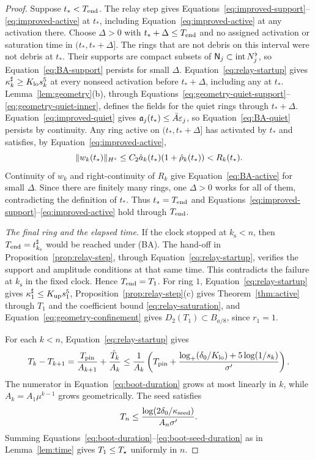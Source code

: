 \begin{proof}
Suppose $t_*<T_{\mathrm{end}}$. The relay step gives
Equations~\eqref{eq:improved-support}--\eqref{eq:improved-active} at $t_*$,
including Equation~\eqref{eq:improved-active} at any activation there.
Choose $\Delta>0$ with
$t_*+\Delta\le T_{\mathrm{end}}$ and no assigned activation or saturation time in
$(t_*,t_*+\Delta]$. The rings that are not debris on this interval were not
debris at $t_*$. Their supports are compact subsets of
$\mathsf{N}_j\subset\operatorname{int}N^{\flat}_j$, so Equation~\eqref{eq:BA-support}
persists for small $\Delta$. Equation~\eqref{eq:relay-startup} gives
$\kappa^\sharp_k\ge K_{\mathrm{lo}} s_k^5$ at every nonseed activation before $t_*+\Delta$,
including any at $t_*$. Lemma~\ref{lem:geometry}(b), through
Equations~\eqref{eq:geometry-quiet-support}--\eqref{eq:geometry-quiet-inner},
defines the fields for the quiet rings through $t_*+\Delta$.
Equation~\eqref{eq:improved-quiet} gives
$\mathfrak{a}_j(t_*)\le\bar A\varepsilon_j$, so Equation~\eqref{eq:BA-quiet}
persists by continuity. Any ring active on $(t_*,t_*+\Delta]$ has activated
by $t_*$ and satisfies, by Equation~\eqref{eq:improved-active},
\begin{equation}
\label{eq:boot-continuation-margin}
\|w_k(t_*)\|_{H^s}\le C_2\hat a_k(t_*)(1+\hat\rho_k(t_*))<R_k(t_*).
\end{equation}
Continuity of $w_k$ and right-continuity of $R_k$ give
Equation~\eqref{eq:BA-active} for small $\Delta$.
Since there are finitely many rings, one $\Delta>0$ works for all
of them, contradicting the definition of $t_*$. Thus $t_*=T_{\mathrm{end}}$ and
Equations~\eqref{eq:improved-support}--\eqref{eq:improved-active} hold through
$T_{\mathrm{end}}$.

\emph{The final ring and the elapsed time.}
If the clock stopped at $k_{\mathrm s}<n$, then
$T_{\mathrm{end}}=t^\sharp_{k_{\mathrm s}}$ would be reached under (BA). The hand-off in
Proposition~\ref{prop:relay-step}, through Equation~\eqref{eq:relay-startup},
verifies the support and amplitude conditions at that same time. This
contradicts the failure at
$k_{\mathrm s}$ in the fixed clock. Hence $T_{\mathrm{end}}=T_1$.
For ring $1$, Equation~\eqref{eq:relay-startup} gives $\kappa^\sharp_1\le K_{\mathrm{up}} s_1^5$,
Proposition~\ref{prop:relay-step}(c) gives Theorem~\ref{thm:active} through
$T_1$ and the coefficient bound \eqref{eq:relay-saturation}, and
Equation~\eqref{eq:geometry-confinement} gives $D_2(T_1)\subset B_{a/8}$,
since $r_1=1$.

For each $k<n$, Equation~\eqref{eq:relay-startup} gives
\begin{equation}
\label{eq:boot-duration}
T_k-T_{k+1}
=\frac{T_{\mathrm{pin}}}{A_{k+1}}+\frac{\hat T_k}{A_k}
\le\frac{1}{A_k}\left(T_{\mathrm{pin}}+
\frac{\log_+(\delta_0/K_{\mathrm{lo}})+5\log(1/s_k)}{\sigma'}\right).
\end{equation}
The numerator in Equation~\eqref{eq:boot-duration} grows at most linearly
in $k$, while $A_k=A_1\mu^{k-1}$ grows geometrically. The seed satisfies
\begin{equation}
\label{eq:boot-seed-duration}
T_n\le\frac{\log(2\delta_0/\kappa_{\mathrm{seed}})}{A_n\sigma'}.
\end{equation}
Summing Equations~\eqref{eq:boot-duration}--\eqref{eq:boot-seed-duration}
as in Lemma~\ref{lem:time} gives $T_1\le T_\star$ uniformly in $n$.
\end{proof}

